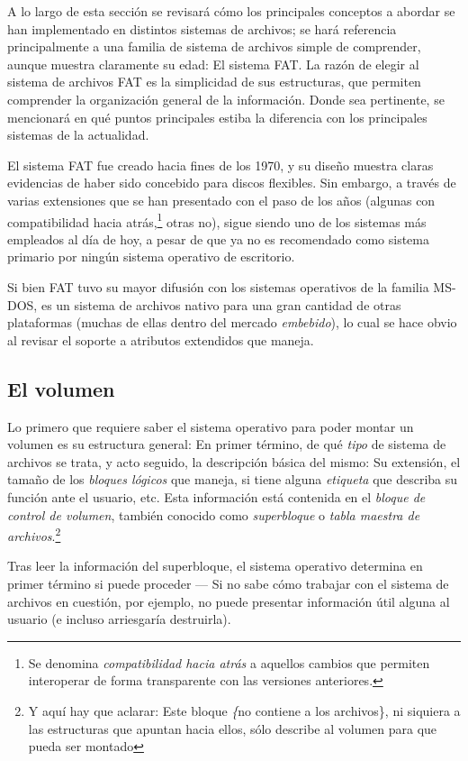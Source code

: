 \documentclass[11pt,fleqn]{book} %
\begin{document}
A lo largo de esta sección se revisará cómo los principales
conceptos a abordar se han implementado en distintos sistemas de
archivos; se hará referencia principalmente a una familia de sistema de
archivos simple de comprender, aunque muestra claramente su edad: El
sistema FAT. La razón de elegir al sistema de archivos FAT es la
simplicidad de sus estructuras, que permiten comprender la
organización general de la información. Donde sea pertinente, se
mencionará en qué puntos principales estiba la diferencia con los
principales sistemas de la actualidad.

El sistema FAT fue creado hacia fines de los 1970, y su diseño muestra
claras evidencias de haber sido concebido para discos flexibles. Sin
embargo, a través de varias extensiones que se han presentado con el
paso de los años (algunas con compatibilidad hacia atrás,\footnote{Se
denomina \emph{compatibilidad hacia atrás} a aquellos cambios que permiten
interoperar de forma transparente con las versiones anteriores. } otras
no), sigue siendo uno de los sistemas más empleados al día de hoy, a
pesar de que ya no es recomendado como sistema primario por ningún
sistema operativo de escritorio.

Si bien FAT tuvo su mayor difusión con los sistemas operativos de la
familia MS-DOS, es un sistema de archivos nativo para una gran
cantidad de otras plataformas (muchas de ellas dentro del mercado
\emph{embebido}), lo cual se hace obvio al revisar el soporte a atributos
extendidos que maneja.
\subsection{El volumen}
\label{sec-7-1-3}


Lo primero que requiere saber el sistema operativo para poder montar
un volumen es su estructura general: En primer término, de qué \emph{tipo}
de sistema de archivos se trata, y acto seguido, la descripción básica
del mismo: Su extensión, el tamaño de los \emph{bloques lógicos} que
maneja, si tiene alguna \emph{etiqueta} que describa su función ante el
usuario, etc. Esta información está contenida en el \emph{bloque de control de volumen}, también conocido como \emph{superbloque} o \emph{tabla maestra de archivos}.\footnote{Y aquí hay que aclarar: Este bloque \emph\{no contiene a
los archivos\}, ni siquiera a las estructuras que apuntan hacia ellos,
sólo describe al volumen para que pueda ser montado }

Tras leer la información del superbloque, el sistema operativo
determina en primer término si puede proceder — Si no sabe cómo
trabajar con el sistema de archivos en cuestión, por ejemplo, no
puede presentar información útil alguna al usuario (e incluso
arriesgaría destruirla).
\end{document}
